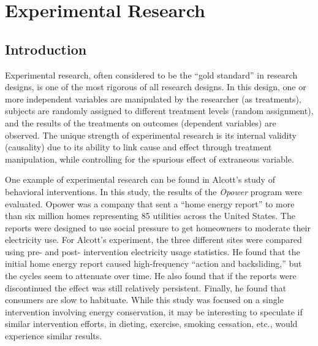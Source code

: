 \chapter{Experimental Research}\label{ch09:experimental_research}

\section{Introduction}

Experimental research, often considered to be the ``gold standard'' in research designs, is one of the most rigorous of all research designs. In this design, one or more independent variables are manipulated by the researcher (as treatments), subjects are randomly assigned to different treatment levels (random assignment), and the results of the treatments on outcomes (dependent variables) are observed. The unique strength of experimental research is its internal validity (causality) due to its ability to link cause and effect through treatment manipulation, while controlling for the spurious effect of extraneous variable.

One example of experimental research can be found in Alcott's study of behavioral interventions\cite{allcott2014short}. In this study, the results of the \textit{Opower} program were evaluated. Opower was a company that sent a ``home energy report'' to more than six million homes representing 85 utilities across the United States. The reports were designed to use social pressure to get homeowners to moderate their electricity use. For Alcott's experiment, the three different sites were compared using pre- and post- intervention electricity usage statistics. He found that the initial home energy report caused high-frequency ``action and backsliding,'' but the cycles seem to attenuate over time. He also found that if the reports were discontinued the effect was still relatively persistent. Finally, he found that consumers are slow to habituate. While this study was focused on a single intervention involving energy conservation, it may be interesting to speculate if similar intervention efforts, in dieting, exercise, smoking cessation, etc., would experience similar results.

